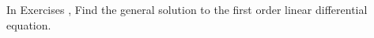 {\noindent In Exercises}
{, Find the general solution to the first order linear differential equation.}
